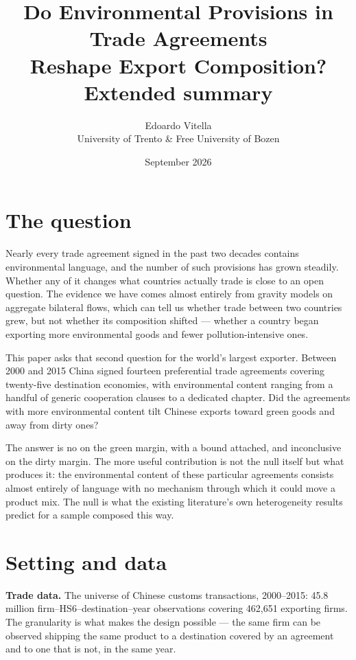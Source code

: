 \documentclass[11pt]{article}
\title{\textbf{Do Environmental Provisions in Trade Agreements\\Reshape Export Composition?}\\[8pt]
\large Extended summary}
\author{Edoardo Vitella\\\small University of Trento \& Free University of Bozen}
\date{September 2026}
\begin{document}
\maketitle
\vspace{-18pt}

\section{The question}

Nearly every trade agreement signed in the past two decades contains environmental language, and
the number of such provisions has grown steadily. Whether any of it changes what countries actually
trade is close to an open question. The evidence we have comes almost entirely from gravity models
on aggregate bilateral flows, which can tell us whether trade between two countries grew, but not
whether its composition shifted --- whether a country began exporting more environmental goods and
fewer pollution-intensive ones.

This paper asks that second question for the world's largest exporter. Between 2000 and 2015 China
signed fourteen preferential trade agreements covering twenty-five destination economies, with
environmental content ranging from a handful of generic cooperation clauses to a dedicated chapter.
Did the agreements with more environmental content tilt Chinese exports toward green goods and away
from dirty ones?

The answer is no on the green margin, with a bound attached, and inconclusive on the dirty margin.
The more useful contribution is not the null itself but what produces it: the environmental content
of these particular agreements consists almost entirely of language with no mechanism through which
it could move a product mix. The null is what the existing literature's own heterogeneity results
predict for a sample composed this way.

\section{Setting and data}

\textbf{Trade data.} The universe of Chinese customs transactions, 2000--2015: 45.8 million
firm--HS6--destination--year observations covering 462,651 exporting firms. The granularity is what
makes the design possible --- the same firm can be observed shipping the same product to a
destination covered by an agreement and to one that is not, in the same year.
\end{document}
